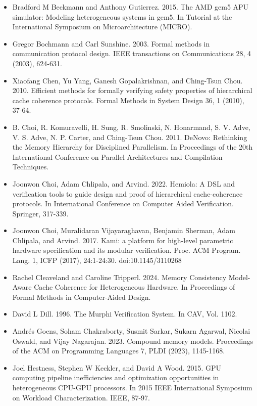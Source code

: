 \documentclass[10pt]{article}
\begin{document}
\begin{itemize}
  \item[] [9] Bradford M Beckmann and Anthony Gutierrez. 2015. The AMD gem5 APU simulator: Modeling heterogeneous systems in gem5. In Tutorial at the International Symposium on Microarchitecture (MICRO).
  \item[] [10] Gregor Bochmann and Carl Sunshine. 2003. Formal methods in communication protocol design. IEEE transactions on Communications 28, 4 (2003), 624-631.
  \item[] [11] Xiaofang Chen, Yu Yang, Ganesh Gopalakrishnan, and Ching-Tsun Chou. 2010. Efficient methods for formally verifying safety properties of hierarchical cache coherence protocols. Formal Methods in System Design 36, 1 (2010), 37-64.
  \item[] [12] B. Choi, R. Komuravelli, H. Sung, R. Smolinski, N. Honarmand, S. V. Adve, V. S. Adve, N. P. Carter, and Ching-Tsun Chou. 2011. DeNovo: Rethinking the Memory Hierarchy for Disciplined Parallelism. In Proceedings of the 20th International Conference on Parallel Architectures and Compilation Techniques.
  \item[] [13] Joonwon Choi, Adam Chlipala, and Arvind. 2022. Hemiola: A DSL and verification tools to guide design and proof of hierarchical cache-coherence protocols. In International Conference on Computer Aided Verification. Springer, 317-339.
  \item[] [14] Joonwon Choi, Muralidaran Vijayaraghavan, Benjamin Sherman, Adam Chlipala, and Arvind. 2017. Kami: a platform for high-level parametric hardware specification and its modular verification. Proc. ACM Program. Lang. 1, ICFP (2017), 24:1-24:30. doi:10.1145/3110268
  \item[] [15] Rachel Cleaveland and Caroline Tripperl. 2024. Memory Consistency Model-Aware Cache Coherence for Heterogeneous Hardware. In Proceedings of Formal Methods in Computer-Aided Design.
  \item[] [16] David L Dill. 1996. The Murphi Verification System. In CAV, Vol. 1102.
  \item[] [17] Andrés Goens, Soham Chakraborty, Susmit Sarkar, Sukarn Agarwal, Nicolai Oswald, and Vijay Nagarajan. 2023. Compound memory models. Proceedings of the ACM on Programming Languages 7, PLDI (2023), 1145-1168.
  \item[] [18] Joel Hestness, Stephen W Keckler, and David A Wood. 2015. GPU computing pipeline inefficiencies and optimization opportunities in heterogeneous CPU-GPU processors. In 2015 IEEE International Symposium on Workload Characterization. IEEE, 87-97.

\end{itemize}
\end{document}
